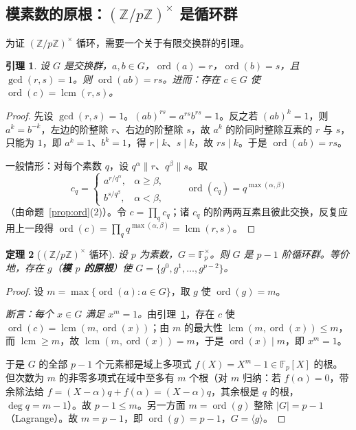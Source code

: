 \documentclass[a4paper,11pt]{ctexart}
\numberwithin{equation}{section}
\theoremstyle{plain}
\newtheorem{theorem}{定理}[section]
\newtheorem{lemma}[theorem]{引理}
\theoremstyle{definition}
\theoremstyle{remark}
\newcommand{\Z}{\mathbb{Z}}
\newcommand{\F}{\mathbb{F}}
\DeclareMathOperator{\ord}{ord}
\DeclareMathOperator{\lcm}{lcm}
\begin{document}
\subsection{模素数的原根：$(\Z/p\Z)^{\times}$ 是循环群}

为证 $(\Z/p\Z)^{\times}$ 循环，需要一个关于有限交换群的引理。

\begin{lemma}\label{lem:lcmorder}
设 $G$ 是交换群，$a,b\in G$，$\ord(a)=r$，$\ord(b)=s$，且 $\gcd(r,s)=1$。则 $\ord(ab)=rs$。进而：存在 $c\in G$ 使 $\ord(c)=\lcm(r,s)$。
\end{lemma}

\begin{proof}
先设 $\gcd(r,s)=1$。$(ab)^{rs}=a^{rs}b^{rs}=1$。反之若 $(ab)^k=1$，则 $a^k=b^{-k}$，左边的阶整除 $r$、右边的阶整除 $s$，故 $a^k$ 的阶同时整除互素的 $r$ 与 $s$，只能为 $1$，即 $a^k=1$、$b^k=1$，得 $r\mid k$、$s\mid k$，故 $rs\mid k$。于是 $\ord(ab)=rs$。

一般情形：对每个素数 $q$，设 $q^{\alpha}\parallel r$、$q^{\beta}\parallel s$。取
\[
c_q=\begin{cases} a^{r/q^{\alpha}}, & \alpha\ge\beta,\\[0.2em] b^{s/q^{\beta}}, & \alpha<\beta,\end{cases}
\qquad \ord(c_q)=q^{\max(\alpha,\beta)}
\]
（由命题~\ref{prop:ord}(2)）。令 $c=\prod_q c_q$；诸 $c_q$ 的阶两两互素且彼此交换，反复应用上一段得 $\ord(c)=\prod_q q^{\max(\alpha,\beta)}=\lcm(r,s)$。
\end{proof}

\begin{theorem}[$(\Z/p\Z)^{\times}$ 循环]\label{thm:primitive}
设 $p$ 为素数，$G=\F_p^{\times}$。则 $G$ 是 $p-1$ 阶循环群。等价地，存在 $g$（\textbf{模 $p$ 的原根}）使 $G=\{g^0,g^1,\dots,g^{p-2}\}$。
\end{theorem}

\begin{proof}
设 $m=\max\{\ord(a):a\in G\}$，取 $g$ 使 $\ord(g)=m$。

\emph{断言：每个 $x\in G$ 满足 $x^{m}=1$。}由引理~\ref{lem:lcmorder}，存在 $c$ 使 $\ord(c)=\lcm(m,\ord(x))$；由 $m$ 的最大性 $\lcm(m,\ord(x))\le m$，而 $\lcm\ge m$，故 $\lcm(m,\ord(x))=m$，于是 $\ord(x)\mid m$，即 $x^m=1$。

于是 $G$ 的全部 $p-1$ 个元素都是域上多项式 $f(X)=X^{m}-1\in\F_p[X]$ 的根。但次数为 $m$ 的非零多项式在域中至多有 $m$ 个根（对 $m$ 归纳：若 $f(\alpha)=0$，带余除法给 $f=(X-\alpha)q+f(\alpha)=(X-\alpha)q$，其余根是 $q$ 的根，$\deg q=m-1$）。故 $p-1\le m$。另一方面 $m=\ord(g)$ 整除 $|G|=p-1$（Lagrange）。故 $m=p-1$，即 $\ord(g)=p-1$，$G=\langle g\rangle$。
\end{proof}
\end{document}
